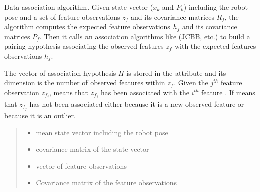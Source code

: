 \documentclass[letterpaper,10pt,english]{sphinxmanual}
\begin{document}
\begin{fulllineitems}
\begin{fulllineitems}
\label{\detokenize{FEKFMBLocalization:FEKFMBL.FEKFMBL.DataAssociation}}
\pysigstartsignatures
{}
\pysigstopsignatures
\sphinxAtStartPar
Data association algorithm. Given state vector (\(x_k\) and \(P_k\)) including the robot pose and a set of feature observations
\(z_f\) and its covariance matrices \(R_f\),  the algorithm  computes the expected feature
observations \(h_f\) and its covariance matrices \(P_f\). Then it calls an association algorithms like
{\hyperref[\detokenize{FEKFMBLocalization:FEKFMBL.FEKFMBL.ICNN}]{}} (JCBB, etc.) to build a pairing hypothesis associating the observed features \(z_f\)
with the expected features observations \(h_f\).

\sphinxAtStartPar
The vector of association hypothesis \(H\) is stored in the  attribute and its dimension is the
number of observed features within \(z_f\). Given the \(j^{th}\) feature observation \(z_{f_j}\), 
means that \(z_{f_j}\) has been associated with the \(i^{th}\) feature . If  means that \(z_{f_j}\)
has not been associated either because it is a new observed feature or because it is an outlier.
\begin{quote}\begin{description}
\begin{itemize}
\item {} 
\sphinxAtStartPar
{} \textendash{} mean state vector including the robot pose

\item {} 
\sphinxAtStartPar
{} \textendash{} covariance matrix of the state vector

\item {} 
\sphinxAtStartPar
{} \textendash{} vector of feature observations

\item {} 
\sphinxAtStartPar
{} \textendash{} Covariance matrix of the feature observations


\end{itemize}
\end{description}
\end{quote}
\end{fulllineitems}
\end{fulllineitems}
\end{document}
